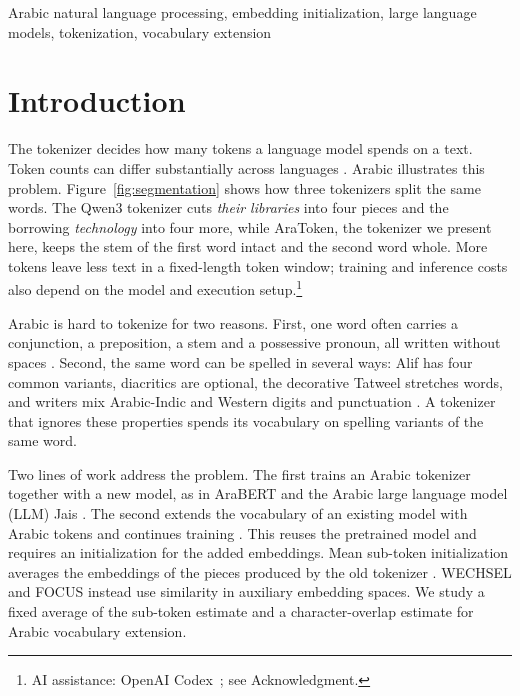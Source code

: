 \documentclass{ieeeaccess}
\begin{document}
\begin{keywords}
Arabic natural language processing, embedding initialization, large language models, tokenization, vocabulary extension
\end{keywords}

\titlepgskip=-15pt

\maketitle

\section{Introduction}
\label{sec:introduction}

The tokenizer decides how many tokens a language model spends on a text.
Token counts can differ substantially across languages
\cite{rust2021good, petrov2023language}. Arabic illustrates this problem.
Figure~\ref{fig:segmentation} shows how three tokenizers split the same
words. The Qwen3 tokenizer cuts \emph{their libraries} into four pieces and
the borrowing \emph{technology} into four more, while AraToken, the tokenizer
we present here, keeps the stem of the first word intact and the second word
whole. More tokens leave less text in a fixed-length token window;
training and inference costs also depend on the model and execution setup.\footnote{AI assistance: OpenAI Codex~\cite{openaicodex2026}; see Acknowledgment.}

Arabic is hard to tokenize for two reasons. First, one word often carries a
conjunction, a preposition, a stem and a possessive pronoun, all written
without spaces \cite{habash2010introduction}. Second, the same word can be
spelled in several ways: Alif has four common variants, diacritics are
optional, the decorative Tatweel stretches words, and writers mix
Arabic-Indic and Western digits and punctuation
\cite{numbencheval, yagi2024arabic}. A tokenizer that ignores these
properties spends its vocabulary on spelling variants of the same word.

Two lines of work address the problem. The first trains an Arabic tokenizer
together with a new model, as in AraBERT \cite{antoun2020arabert} and the
Arabic large language model (LLM) Jais \cite{sengupta2023jais}. The second extends the vocabulary of
an existing model with Arabic tokens and continues training
\cite{kuwain_2025, arallama_2024, rightnow_2026}. This reuses the pretrained
model and requires an initialization for the added embeddings.
Mean sub-token initialization averages the embeddings of the pieces produced
by the old tokenizer \cite{tejaswi2024design}. WECHSEL
\cite{minixhofer2022wechsel} and FOCUS \cite{dobler2023focus} instead use
similarity in auxiliary embedding spaces. We study a fixed average of the
sub-token estimate and a character-overlap estimate for Arabic vocabulary
extension.
\end{document}
